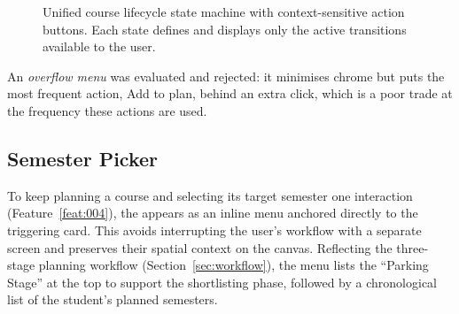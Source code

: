 \begin{figure}[htbp]
\caption{Unified course lifecycle state machine with context-sensitive action buttons. Each state defines and displays only the active transitions available to the user.}
\label{fig:action-buttons}
\end{figure}

An \emph{overflow menu} was evaluated and rejected: it minimises chrome but puts the most frequent action, Add to plan, behind an extra click, which is a poor trade at the frequency these actions are used.

\subsection{Semester Picker}
\label{sec:semester-picker}

To keep planning a course and selecting its target semester one interaction (Feature~\ref{feat:004}), the  appears as an inline menu anchored directly to the triggering card. This avoids interrupting the user's workflow with a separate screen and preserves their spatial context on the canvas. Reflecting the three-stage planning workflow (Section~\ref{sec:workflow}), the menu lists the \enquote{Parking Stage} at the top to support the shortlisting phase, followed by a chronological list of the student's planned semesters. 

